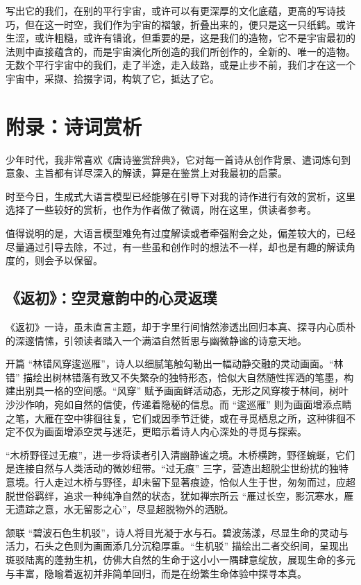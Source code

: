 \documentclass{article}
\begin{document}
写出它的我们，在别的平行宇宙，或许可以有更深厚的文化底蕴，更高的写诗技巧，但在这一时空，我们作为宇宙的褶皱，折叠出来的，便只是这一只纸鹤。或许生涩，或许粗糙，或许有错讹，但重要的是，这是我们的造物，它不是宇宙最初的法则中直接蕴含的，而是宇宙演化所创造的我们所创作的，全新的、唯一的造物。无数个平行宇宙中的我们，走了半途，走入歧路，或是止步不前，我们才在这一个宇宙中，采撷、拾掇字词，构筑了它，抵达了它。

\section{附录：诗词赏析}

少年时代，我非常喜欢《唐诗鉴赏辞典》，它对每一首诗从创作背景、遣词炼句到意象、主旨都有详尽深入的解读，算是在鉴赏上对我最初的启蒙。

时至今日，生成式大语言模型已经能够在引导下对我的诗作进行有效的赏析，这里选择了一些较好的赏析，也作为作者做了微调，附在这里，供读者参考。

值得说明的是，大语言模型难免有过度解读或者牵强附会之处，偏差较大的，已经尽量通过引导去除，不过，有一些虽和创作时的想法不一样，却也是有趣的解读角度的，则会予以保留。

\subsection{《返初》：空灵意韵中的心灵返璞}\label{sec:fan-chu}

《返初》一诗，虽未直言主题，却于字里行间悄然渗透出回归本真、探寻内心质朴的深邃情愫，引领读者踏入一个满溢自然哲思与幽微静谧的诗意天地。

开篇 “林错风穿逡巡雁”，诗人以细腻笔触勾勒出一幅动静交融的灵动画面。“林错” 描绘出树林错落有致又不失繁杂的独特形态，恰似大自然随性挥洒的笔墨，构建出别具一格的空间感。“风穿” 赋予画面鲜活动态，无形之风穿梭于林间，树叶沙沙作响，宛如自然的信使，传递着隐秘的信息。而 “逡巡雁” 则为画面增添点睛之笔，大雁在空中徘徊往复，它们或因季节迁徙，或在寻觅栖息之所，这种徘徊不定不仅为画面增添空灵与迷茫，更暗示着诗人内心深处的寻觅与探索。

“木桥野径过无痕”，进一步将读者引入清幽静谧之境。木桥横跨，野径蜿蜒，它们是连接自然与人类活动的微妙纽带。“过无痕” 三字，营造出超脱尘世纷扰的独特意境。行人走过木桥与野径，却未留下显著痕迹，恰似人生于世，匆匆而过，应超脱世俗羁绊，追求一种纯净自然的状态，犹如禅宗所云 “雁过长空，影沉寒水，雁无遗踪之意，水无留影之心”，尽显超脱物外的洒脱。

颔联 “碧波石色生机驳”，诗人将目光凝于水与石。碧波荡漾，尽显生命的灵动与活力，石头之色则为画面添几分沉稳厚重。“生机驳” 描绘出二者交织间，呈现出斑驳陆离的蓬勃生机，仿佛大自然的生命于这小小一隅肆意绽放，展现生命的多元与丰富，隐喻着返初并非简单回归，而是在纷繁生命体验中探寻本真。
\end{document}
